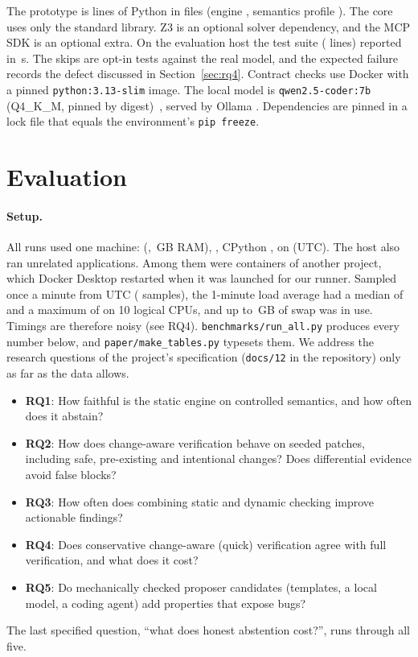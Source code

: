\documentclass[10pt,twocolumn]{article}
\begin{document}
The prototype is \ImplSrcLines{} lines of Python in \ImplSrcFiles{} files (engine \HostEngine{}, semantics profile
\texttt{\HostSemantics}). The core uses only the standard library. Z3 \HostZThree{} is an optional solver dependency,
and the MCP SDK is an optional extra. On the evaluation host the test suite (\ImplTestLines{} lines) reported
\emph{\TestSummary} in \TestSeconds\,s. The skips are opt-in tests against the real model, and the expected failure
records the defect discussed in Section~\ref{sec:rq4}. Contract checks use Docker \HostDocker{} with a pinned
\texttt{python:3.13-slim} image. The local model is \texttt{qwen2.5-coder:7b} (Q4\_K\_M, pinned by
digest)~\cite{hui2024qwen25coder}, served by Ollama \HostOllama{}. Dependencies are pinned in a lock file that equals
the environment's \texttt{pip freeze}.

\section{Evaluation}
\label{sec:eval}

\paragraph{Setup.}
All runs used one machine: \HostModel{} (\HostCpu{}, \HostRamGB\,GB RAM), \HostOs{}, CPython \HostPython{}, on
\RunDates{} (UTC). The host also ran unrelated applications. Among them were containers of another project, which Docker
Desktop restarted when it was launched for our runner. Sampled once a minute from \HostLoadWindow{} UTC (\HostLoadSamples{}
samples), the 1-minute load average had a median of \HostLoadMedian{} and a maximum of \HostLoadMax{} on 10 logical
CPUs, and up to \HostSwapMaxGB\,GB of swap was in use. Timings are therefore noisy (see RQ4).
\texttt{benchmarks/run\_all.py} produces every number below, and \texttt{paper/make\_tables.py} typesets them. We address
the research questions of the project's specification (\texttt{docs/12} in the repository) only as far as the data
allows.
\begin{itemize}
\item \textbf{RQ1}: How faithful is the static engine on controlled semantics, and how often does it abstain?
\item \textbf{RQ2}: How does change-aware verification behave on seeded patches, including safe, pre-existing and
  intentional changes? Does differential evidence avoid false blocks?
\item \textbf{RQ3}: How often does combining static and dynamic checking improve actionable findings?
\item \textbf{RQ4}: Does conservative change-aware (quick) verification agree with full verification, and what does it
  cost?
\item \textbf{RQ5}: Do mechanically checked proposer candidates (templates, a local model, a coding agent) add
  properties that expose bugs?
\end{itemize}
The last specified question, ``what does honest abstention cost?'', runs through all five.
\end{document}
